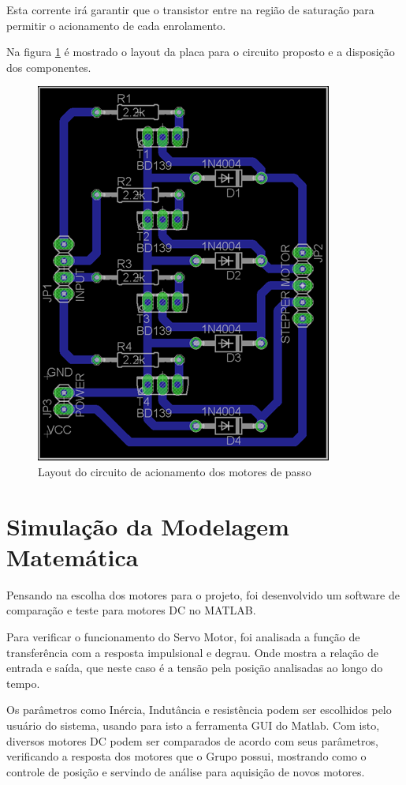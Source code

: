 Esta corrente irá garantir que o transistor entre na região de saturação para permitir o acionamento de cada enrolamento.

Na figura \ref{layout} é mostrado o layout da placa para o circuito proposto e a disposição dos componentes.

\begin{figure}[H]
		\centering
			\includegraphics[scale=1.0]{figuras/layout.png}
		\caption{Layout do circuito de acionamento dos motores de passo}
		\label{layout}
\end{figure}


\section[Simulação da Modelagem Matemática]{Simulação da Modelagem Matemática}

Pensando na escolha dos motores para o projeto, foi desenvolvido um software de comparação e teste para motores DC  no MATLAB.

Para verificar o funcionamento do Servo Motor, foi analisada a função de transferência com a resposta impulsional e degrau. Onde mostra a relação de entrada e saída, que neste caso é a tensão pela posição analisadas ao longo do tempo.

Os parâmetros como Inércia, Indutância e resistência podem ser escolhidos pelo usuário do sistema, usando para isto a ferramenta GUI do Matlab. Com isto, diversos motores DC podem ser comparados de acordo com seus parâmetros, verificando a resposta dos motores que o Grupo possui, mostrando como o controle de posição e servindo de análise para aquisição de novos motores.

